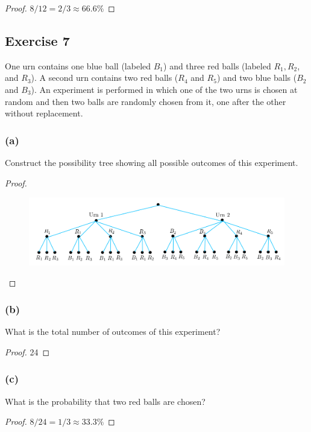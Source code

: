 \documentclass[14pt]{extarticle}
\begin{document}
\begin{proof}
\(8/12 = 2/3 \approx 66.6\%\)
\end{proof}

\subsection{Exercise 7}
One urn contains one blue ball (labeled \(B_1\)) and three red balls (labeled \(R_1, R_2\), and \(R_3\)). A second urn 
contains two red balls (\(R_4\) and \(R_5\)) and two blue balls (\(B_2\) and \(B_3\)). An experiment is performed in 
which one of the two urns is chosen at random and then two balls are randomly chosen from it, one after the other 
without replacement.

\subsubsection{(a)}
Construct the possibility tree showing all possible outcomes of this experiment.

\begin{proof}
\begin{figure}[ht!]
\centering
\includegraphics[scale=0.5]{../images/9.2.7.a.png}
\end{figure}
\end{proof}

\subsubsection{(b)}
What is the total number of outcomes of this experiment?

\begin{proof}
24
\end{proof}

\subsubsection{(c)}
What is the probability that two red balls are chosen?

\begin{proof}
\(8/24 = 1/3 \approx 33.3\%\)
\end{proof}
\end{document}
